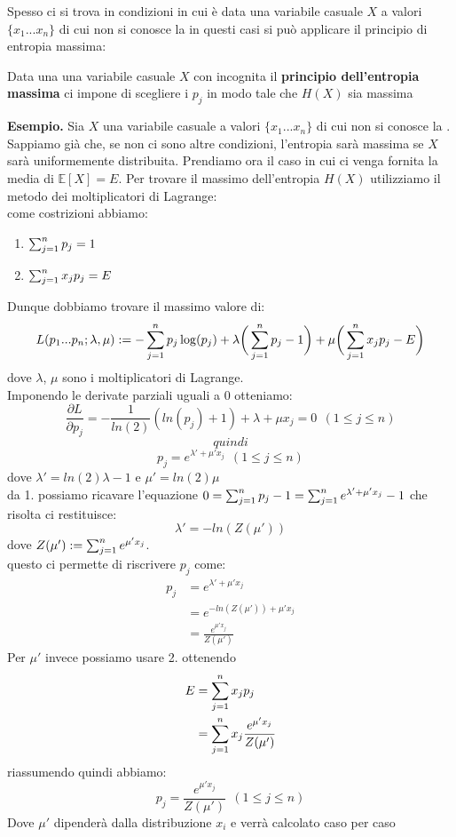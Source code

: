 Spesso ci si trova in condizioni in cui è data una variabile casuale $X$ a valori $\{ x_1...x_n \}$ di cui non si conosce la \lep  in questi casi si può applicare il principio di entropia massima:\\
\begin{defi}
Data una una variabile casuale $X$ con \lep  incognita il \textbf{principio dell'entropia massima} ci impone di scegliere i $p_j$ in modo tale che $H(X)$ sia massima
\end{defi}
\textbf{Esempio.} 
Sia $X$ una variabile casuale a valori $\{ x_1...x_n \}$ di cui non si conosce la \lep . Sappiamo già che, se non ci sono altre condizioni, l'entropia sarà massima se $X$ sarà uniformemente distribuita. Prendiamo ora il caso in cui ci venga fornita la media di $\mathbb{E}[ X]=E$. Per trovare il massimo dell'entropia $H(X)$ utilizziamo il metodo dei  moltiplicatori di Lagrange:\\
come costrizioni abbiamo:
\begin{enumerate}
\item $\sum_{j=1}^n p_j=1$
\item $\sum_{j=1}^n x_j p_j=E$
\end{enumerate}
Dunque dobbiamo trovare il massimo valore di:
\begin{equation}
L(p_1...p_n;\lambda,\mu ):= -\sum_{j=1}^n p_j \log(p_j) + \lambda \bigg( \sum_{j=1}^n p_j -1 \bigg) + \mu \bigg( \sum_{j=1}^n x_j p_j - E \bigg)
\end{equation}
dove $\lambda$, $\mu$ sono i moltiplicatori di Lagrange.\\
Imponendo le derivate parziali uguali a 0 otteniamo:
$$\frac{\partial L}{\partial p_j}=-\frac{1}{ln(2)}(ln(p_j)+1)+\lambda + \mu x_j=0 \ \  (1\leq j \leq n) $$
$$quindi$$
$$p_j=e^{\lambda ' + \mu ' x_j} \ \ (1\leq j \leq n)$$
dove $\lambda ' = ln(2) \lambda -1 $ e $\mu ' = ln(2) \mu$\\
da 1. possiamo ricavare l'equazione $0=\sum_{j=1}^n p_j -1= \sum_{j=1}^n e^{\lambda ' + \mu ' x_j} -1$ che risolta ci restituisce:
$$\lambda ' = - ln(Z( \mu '))$$
dove $Z( \mu '):= \sum_{j=1}^n e^{\mu ' x_j}$.\\
questo ci permette di riscrivere $p_j$ come:
\[
\begin{split}
p_j &= e^{\lambda ' + \mu ' x_j} \\
& = e^{- ln(Z( \mu ')) + \mu ' x_j}  \\
& = \frac{e^{\mu ' x_j}}{Z( \mu ')}
\end{split}
\]
Per $\mu'$ invece possiamo usare 2. ottenendo 
\[
\begin{split}
E &=\sum_{j=1}^n x_j p_j \\
& = \sum_{j=1}^n x_j \frac{e^{\mu ' x_j}}{Z( \mu ')}
\end{split}
\]
riassumendo quindi abbiamo:
\begin{equation}
p_j=\frac{e^{\mu ' x_j}}{Z( \mu ')} \ \ (1\leq j \leq n)
\end{equation}
Dove $\mu'$ dipenderà dalla distribuzione $x_i$ e verrà calcolato caso per caso


